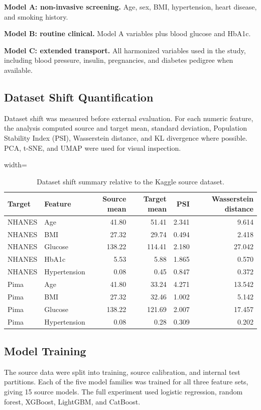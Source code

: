 \documentclass[11pt]{article}
\begin{document}
\textbf{Model A: non-invasive screening.} Age, sex, BMI, hypertension, heart disease, and smoking history.

\textbf{Model B: routine clinical.} Model A variables plus blood glucose and HbA1c.

\textbf{Model C: extended transport.} All harmonized variables used in the study, including blood pressure, insulin, pregnancies, and diabetes pedigree when available.

\subsection{Dataset Shift Quantification}
Dataset shift was measured before external evaluation. For each numeric feature, the analysis computed source and target mean, standard deviation, Population Stability Index (PSI), Wasserstein distance, and KL divergence where possible. PCA, t-SNE, and UMAP were used for visual inspection.

\begin{table}[H]
\centering
\caption{Dataset shift summary relative to the Kaggle source dataset.}
\label{tab:shift}
\begin{adjustbox}{width=\textwidth}
\begin{tabular}{llrrrr}
\toprule
Target & Feature & Source mean & Target mean & PSI & Wasserstein distance \\
\midrule
NHANES & Age & 41.80 & 51.41 & 2.341 & 9.614 \\
NHANES & BMI & 27.32 & 29.74 & 0.494 & 2.418 \\
NHANES & Glucose & 138.22 & 114.41 & 2.180 & 27.042 \\
NHANES & HbA1c & 5.53 & 5.88 & 1.865 & 0.570 \\
NHANES & Hypertension & 0.08 & 0.45 & 0.847 & 0.372 \\
Pima & Age & 41.80 & 33.24 & 4.271 & 13.542 \\
Pima & BMI & 27.32 & 32.46 & 1.002 & 5.142 \\
Pima & Glucose & 138.22 & 121.69 & 2.007 & 17.457 \\
Pima & Hypertension & 0.08 & 0.28 & 0.309 & 0.202 \\
\bottomrule
\end{tabular}
\end{adjustbox}
\end{table}

\subsection{Model Training}
The source data were split into training, source calibration, and internal test partitions. Each of the five model families was trained for all three feature sets, giving 15 source models. The full experiment used logistic regression, random forest, XGBoost, LightGBM, and CatBoost.
\end{document}
